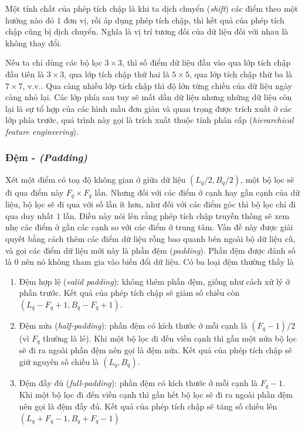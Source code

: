 Một tính chất của phép tích chập là khi ta dịch chuyển (\textit{shift}) các điểm theo một hướng nào đó $1$ đơn vị, rồi áp dụng phép tích chập, thì kết quả của phép tích chập cũng bị dịch chuyển. Nghĩa là vị trí tương đối của dữ liệu đối với nhau là không thay đổi.

Nếu ta chỉ dùng các bộ lọc $3\times 3$, thì số điểm dữ liệu đầu vào qua lớp tích chập đầu tiên là $3\times 3$, qua lớp tích chập thứ hai là $5\times 5$, qua lớp tích chập thứ ba là $7\times 7$, v.v.. Qua càng nhiều lớp tích chập thì độ lớn từng chiều của dữ liệu ngày càng nhỏ lại. Các lớp phía sau tuy sẽ mất dần dữ liệu nhưng những dữ liệu còn lại là sự tổ hợp của các hình mẫu đơn giản và quan trọng được trích xuất ở các lớp phía trước, quá trình này gọi là trích xuất thuộc tính phân cấp (\textit{hierarchical feature engineering}).

\subsubsection{Đệm - \textit{(Padding)}}
Xét một điểm có toạ độ không gian ở giữa dữ liệu $(L_q/2,B_q/2)$, một bộ lọc sẽ đi qua điểm này $F_q\times F_q$ lần. Nhưng đối với các điểm ở cạnh hay gần cạnh của dữ liệu, bộ lọc sẽ đi qua với số lần ít hơn, như đối với các điểm góc thì bộ lọc chỉ đi qua duy nhất $1$ lần. Điều này nói lên rằng phép tích chập truyền thống sẽ xem nhẹ các điểm ở gần các cạnh so với các điểm ở trung tâm. Vấn đề này được giải quyết bằng cách thêm các điểm dữ liệu rỗng bao quanh bên ngoài bộ dữ liệu cũ, và gọi các điểm dữ liệu mới này là phần đệm (\textit{padding}). Phần đệm được đánh số là $0$ nên nó không tham gia vào biến đổi dữ liệu. Có ba loại đệm thường thấy là
\begin{enumerate}
    \item Đệm hợp lệ (\textit{valid padding}): không thêm phần đệm, giống như cách xử lý ở phần trước. Kết quả của phép tích chập sẽ giảm số chiều còn $(L_q-F_q+1,B_q-F_q+1)$.
    \item Đệm nửa (\textit{half-padding}): phần đệm có kích thước ở mỗi cạnh là $(F_q-1)/2$ (vì $F_q$ thường là lẻ). Khi một bộ lọc đi đến viền cạnh thì gần một nửa bộ lọc sẽ đi ra ngoài phần đệm nên gọi là đệm nửa. Kết quả của phép tích chập sẽ giữ nguyên số chiều là $(L_q,B_q)$.
    \item Đệm đầy đủ (\textit{full-padding}): phần đệm có kích thước ở mỗi cạnh là $F_q-1$. Khi một bộ lọc đi đến viền cạnh thì gần hết bộ lọc sẽ đi ra ngoài phần đệm nên gọi là đệm đầy đủ. Kết quả của phép tích chập sẽ tăng số chiều lên $(L_q+F_q-1,B_q+F_q-1)$
\end{enumerate}

